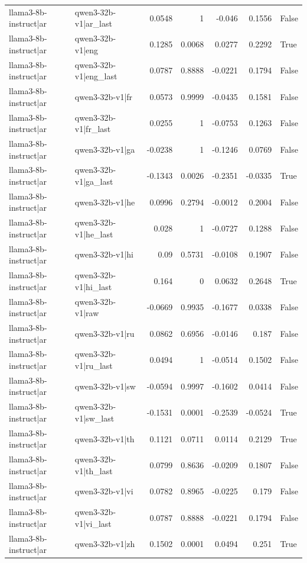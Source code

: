 \begin{table}
\begin{tabular}{l l r r r r l}
llama3-8b-instruct|ar & qwen3-32b-v1|ar_last & 0.0548 & 1 & -0.046 & 0.1556 & False \\
llama3-8b-instruct|ar & qwen3-32b-v1|eng & 0.1285 & 0.0068 & 0.0277 & 0.2292 & True \\
llama3-8b-instruct|ar & qwen3-32b-v1|eng_last & 0.0787 & 0.8888 & -0.0221 & 0.1794 & False \\
llama3-8b-instruct|ar & qwen3-32b-v1|fr & 0.0573 & 0.9999 & -0.0435 & 0.1581 & False \\
llama3-8b-instruct|ar & qwen3-32b-v1|fr_last & 0.0255 & 1 & -0.0753 & 0.1263 & False \\
llama3-8b-instruct|ar & qwen3-32b-v1|ga & -0.0238 & 1 & -0.1246 & 0.0769 & False \\
llama3-8b-instruct|ar & qwen3-32b-v1|ga_last & -0.1343 & 0.0026 & -0.2351 & -0.0335 & True \\
llama3-8b-instruct|ar & qwen3-32b-v1|he & 0.0996 & 0.2794 & -0.0012 & 0.2004 & False \\
llama3-8b-instruct|ar & qwen3-32b-v1|he_last & 0.028 & 1 & -0.0727 & 0.1288 & False \\
llama3-8b-instruct|ar & qwen3-32b-v1|hi & 0.09 & 0.5731 & -0.0108 & 0.1907 & False \\
llama3-8b-instruct|ar & qwen3-32b-v1|hi_last & 0.164 & 0 & 0.0632 & 0.2648 & True \\
llama3-8b-instruct|ar & qwen3-32b-v1|raw & -0.0669 & 0.9935 & -0.1677 & 0.0338 & False \\
llama3-8b-instruct|ar & qwen3-32b-v1|ru & 0.0862 & 0.6956 & -0.0146 & 0.187 & False \\
llama3-8b-instruct|ar & qwen3-32b-v1|ru_last & 0.0494 & 1 & -0.0514 & 0.1502 & False \\
llama3-8b-instruct|ar & qwen3-32b-v1|sw & -0.0594 & 0.9997 & -0.1602 & 0.0414 & False \\
llama3-8b-instruct|ar & qwen3-32b-v1|sw_last & -0.1531 & 0.0001 & -0.2539 & -0.0524 & True \\
llama3-8b-instruct|ar & qwen3-32b-v1|th & 0.1121 & 0.0711 & 0.0114 & 0.2129 & True \\
llama3-8b-instruct|ar & qwen3-32b-v1|th_last & 0.0799 & 0.8636 & -0.0209 & 0.1807 & False \\
llama3-8b-instruct|ar & qwen3-32b-v1|vi & 0.0782 & 0.8965 & -0.0225 & 0.179 & False \\
llama3-8b-instruct|ar & qwen3-32b-v1|vi_last & 0.0787 & 0.8888 & -0.0221 & 0.1794 & False \\
llama3-8b-instruct|ar & qwen3-32b-v1|zh & 0.1502 & 0.0001 & 0.0494 & 0.251 & True \\

\end{tabular}
\end{table}
